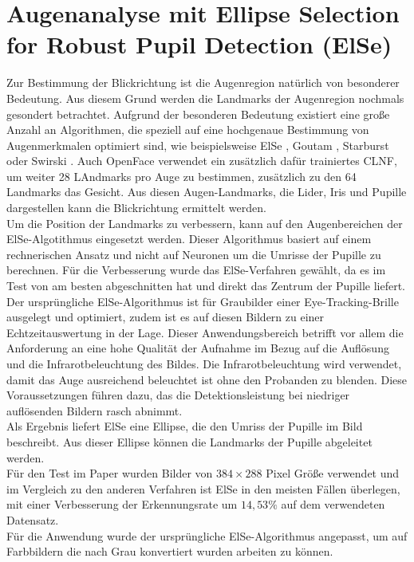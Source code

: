 \section{Augenanalyse mit Ellipse Selection for Robust Pupil Detection (ElSe)}
\label{ElSe}
Zur Bestimmung der Blickrichtung ist die Augenregion natürlich von besonderer Bedeutung. Aus diesem Grund werden die Landmarks der Augenregion nochmals gesondert betrachtet. Aufgrund der besonderen Bedeutung existiert eine große Anzahl an Algorithmen, die speziell auf eine hochgenaue Bestimmung von Augenmerkmalen optimiert sind, wie beispielsweise ElSe \cite{ElSe}, Goutam \cite{Eye_FastCorner}, Starburst \cite{Starburst} oder Swirski \cite{Swirski2012}. Auch OpenFace verwendet ein zusätzlich dafür trainiertes CLNF, um weiter 28 LAndmarks pro Auge zu bestimmen, zusätzlich zu den 64 Landmarks das Gesicht. Aus diesen Augen-Landmarks, die Lider, Iris und Pupille dargestellen kann die Blickrichtung ermittelt werden.\\
Um die Position der Landmarks zu verbessern, kann auf den Augenbereichen der ElSe-Algotithmus eingesetzt werden. Dieser Algorithmus basiert auf einem rechnerischen Ansatz und nicht auf Neuronen um die Umrisse der Pupille zu berechnen. Für die Verbesserung wurde das ElSe-Verfahren gewählt, da es im Test von \cite{ElSe} am besten abgeschnitten hat und direkt das Zentrum der Pupille liefert.\\
Der ursprüngliche ElSe-Algorithmus ist für Graubilder einer Eye-Tracking-Brille ausgelegt und optimiert, zudem ist es auf diesen Bildern zu einer Echtzeitauswertung in der Lage. Dieser Anwendungsbereich betrifft vor allem die Anforderung an eine hohe Qualität der Aufnahme im Bezug auf die Auflösung und die Infrarotbeleuchtung des Bildes. Die Infrarotbeleuchtung wird verwendet, damit das Auge ausreichend beleuchtet ist ohne den Probanden zu blenden. Diese Voraussetzungen führen dazu, das die Detektionsleistung bei niedriger auflösenden Bildern rasch abnimmt.\\
Als Ergebnis liefert ElSe eine Ellipse, die den Umriss der Pupille im Bild beschreibt. Aus dieser Ellipse können die Landmarks der Pupille abgeleitet werden.\\
Für den Test im Paper wurden Bilder von $384\times 288$ Pixel Größe verwendet und im Vergleich zu den anderen Verfahren ist ElSe in den meisten Fällen überlegen, mit einer Verbesserung der Erkennungsrate um $14,53\%$ auf dem verwendeten Datensatz.\cite{ElSe}\\
Für die Anwendung wurde der ursprüngliche ElSe-Algorithmus angepasst, um auf Farbbildern die nach Grau konvertiert wurden arbeiten zu können.
